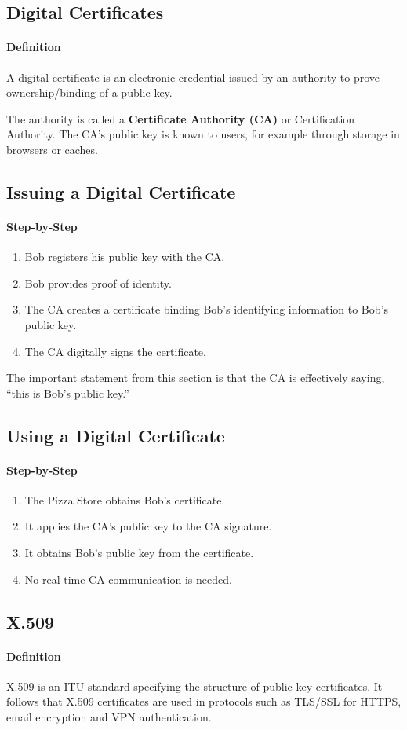\documentclass[12pt]{article}
\newcommand{\Definition}{\paragraph{Definition}}
\newcommand{\Step}{\paragraph{Step-by-Step}}
\begin{document}
\subsection{Digital Certificates}
\Definition A digital certificate is an electronic credential issued by an authority to prove ownership/binding of a public key.

The authority is called a \textbf{Certificate Authority (CA)} or Certification Authority. The CA's public key is known to users, for example through storage in browsers or caches.

\subsection{Issuing a Digital Certificate}
\Step
\begin{enumerate}
    \item Bob registers his public key with the CA.
    \item Bob provides proof of identity.
    \item The CA creates a certificate binding Bob's identifying information to Bob's public key.
    \item The CA digitally signs the certificate.
\end{enumerate}

The important statement from this section is that the CA is effectively saying, ``this is Bob's public key.''

\subsection{Using a Digital Certificate}
\Step
\begin{enumerate}
    \item The Pizza Store obtains Bob's certificate.
    \item It applies the CA's public key to the CA signature.
    \item It obtains Bob's public key from the certificate.
    \item No real-time CA communication is needed.
\end{enumerate}

\subsection{X.509}
\Definition X.509 is an ITU standard specifying the structure of public-key certificates. It follows that X.509 certificates are used in protocols such as TLS/SSL for HTTPS, email encryption and VPN authentication.
\end{document}
